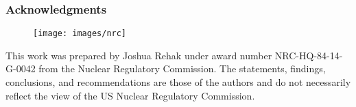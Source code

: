 \documentclass[xcolor=x11names, compress]{beamer}
\begin{document}
\begin{frame}
  \frametitle{Acknowledgments}
  \begin{figure}[h!]
    \centering
    \texttt{[image: images/nrc]}
  \end{figure}\centering
  \small This work was prepared by Joshua Rehak under award number
  NRC-HQ-84-14-G-0042 from the Nuclear Regulatory Commission. The
  statements, findings, conclusions, and recommendations are those of
  the authors and do not necessarily reflect the view of the US
  Nuclear Regulatory Commission.
\end{frame}

\appendix

\end{document}
